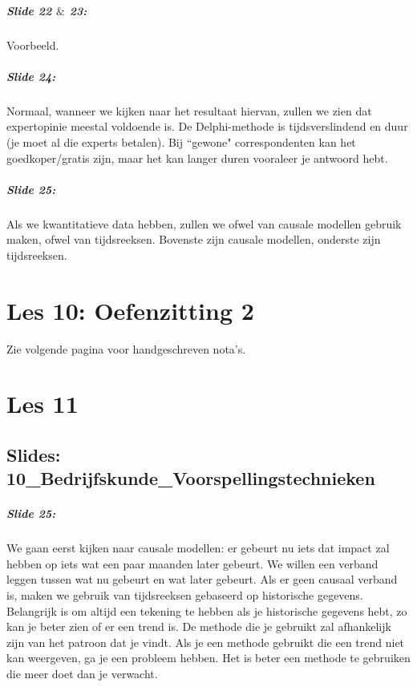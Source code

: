 \documentclass[10pt,a4paper]{report}
\begin{document}
\paragraph{Slide 22 $\&$ 23:} Voorbeeld.

\paragraph{Slide 24:} Normaal, wanneer we kijken naar het resultaat hiervan, zullen we zien dat expertopinie meestal voldoende is. De Delphi-methode is tijdsverslindend en duur (je moet al die experts betalen). Bij ``gewone" correspondenten kan het goedkoper/gratis zijn, maar het kan langer duren vooraleer je antwoord hebt. 

\paragraph{Slide 25:} Als we kwantitatieve data hebben, zullen we ofwel van causale modellen gebruik maken, ofwel van tijdsreeksen. Bovenste zijn causale modellen, onderste zijn tijdsreeksen.

\chapter{Les 10: Oefenzitting 2}
Zie volgende pagina voor handgeschreven nota's.

 

\chapter{Les 11}

\section{Slides: 10\_Bedrijfskunde\_Voorspellingstechnieken}

\paragraph{Slide 25:} We gaan eerst kijken naar causale modellen: er gebeurt nu iets dat impact zal hebben op iets wat een paar maanden later gebeurt. We willen een verband leggen tussen wat nu gebeurt en wat later gebeurt.
Als er geen causaal verband is, maken we gebruik van tijdsreeksen gebaseerd op historische gegevens.\\
Belangrijk is om altijd een tekening te hebben als je historische gegevens hebt, zo kan je beter zien of er een trend is. De methode die je gebruikt zal afhankelijk zijn van het patroon dat je vindt. Als je een methode gebruikt die een trend niet kan weergeven, ga je een probleem hebben. Het is beter een methode te gebruiken die meer doet dan je verwacht. 
\end{document}
